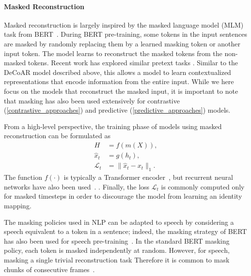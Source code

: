 \paragraph{Masked Reconstruction}

Masked reconstruction is largely inspired by the masked language model (MLM) task from BERT~\cite{devlin_bert_2018}. During BERT pre-training, some tokens in the input sentences are masked by randomly replacing them by a learned masking token or another input token. The model learns to reconstruct the masked tokens from the non-masked tokens. Recent work has explored similar pretext tasks . Similar to the DeCoAR model described above, this allows a model to learn contextualized representations that encode information from the entire input. While we here focus on the models that reconstruct the masked input, it is important to note that masking has also been used extensively for contrastive (\cref{contrastive_approaches}) and predictive (\cref{predictive_approaches}) models. 

From a high-level perspective, the training phase of models using masked
reconstruction can be formulated as
\begin{align}
    H &= f(m(X)), \\
    \hat{x}_t &= g(h_{t}), \\
    \mathcal{L}_t &= \lVert \hat{x}_{t} - x_{t} \rVert_1 .
\end{align}
The function $f(\cdot)$ is typically a Transformer encoder~\cite{liu_mockingjay_2020,jiang_improving_2019,liu_masked_2020}, but recurrent neural networks have also been used~\cite{wang_unsupervised_2020}.  . Finally, the loss $\mathcal{L}_t$ is commonly computed only for masked timesteps in order to discourage the model from learning an identity mapping.

The masking policies used in NLP can be adapted to speech by considering a speech  equivalent to a token in a sentence; indeed, the masking strategy of BERT has also been used for speech pre-training~\cite{liu_mockingjay_2020}.
In the standard BERT masking policy, each token is masked independently at random. However, for speech, masking a single  trivial reconstruction task  Therefore it is common to mask chunks of consecutive frames~\cite{liu_mockingjay_2020,jiang_further_2021}. 

